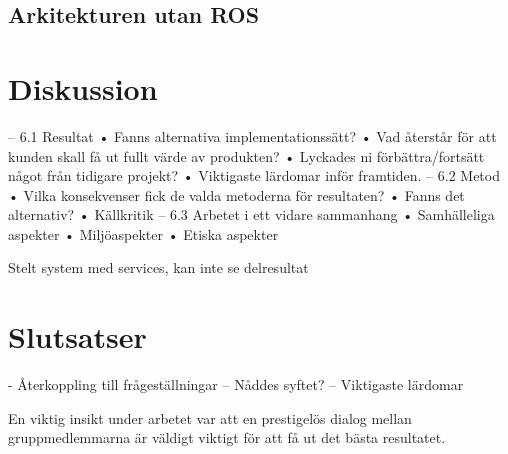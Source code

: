 \subsection{Arkitekturen utan ROS}



\section{Diskussion}
\label{sec:discussion-lundberg}

– 6.1 Resultat
• Fanns alternativa implementationssätt?
• Vad återstår för att kunden skall få ut fullt värde av
produkten?
• Lyckades ni förbättra/fortsätt något från tidigare projekt?
• Viktigaste lärdomar inför framtiden.
– 6.2 Metod
• Vilka konsekvenser fick de valda metoderna för resultaten?
• Fanns det alternativ?
• Källkritik
– 6.3 Arbetet i ett vidare sammanhang
• Samhälleliga aspekter
• Miljöaspekter
• Etiska aspekter

Stelt system med services, kan inte se delresultat


\section{Slutsatser}
\label{sec:conclusions-lundberg}

- Återkoppling till frågeställningar
– Nåddes syftet?
– Viktigaste lärdomar

En viktig insikt under arbetet var att en prestigelös dialog mellan gruppmedlemmarna är väldigt viktigt för att få ut det bästa resultatet.

